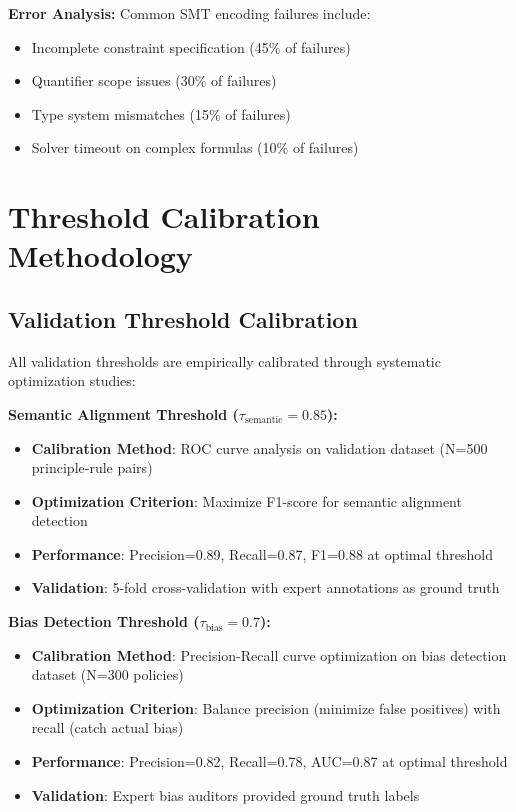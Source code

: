 \documentclass[sigconf,natbib]{acmart}
\begin{document}
\textbf{Error Analysis:}
Common SMT encoding failures include:
\begin{itemize}
    \item Incomplete constraint specification (45\% of failures)
    \item Quantifier scope issues (30\% of failures)
    \item Type system mismatches (15\% of failures)
    \item Solver timeout on complex formulas (10\% of failures)
\end{itemize}

\section{Threshold Calibration Methodology}
\label{app:threshold_calibration}

\subsection{Validation Threshold Calibration}
All validation thresholds are empirically calibrated through systematic optimization studies:

\textbf{Semantic Alignment Threshold ($\tau_{\text{semantic}} = 0.85$):}
\begin{itemize}
    \item \textbf{Calibration Method}: ROC curve analysis on validation dataset (N=500 principle-rule pairs)
    \item \textbf{Optimization Criterion}: Maximize F1-score for semantic alignment detection
    \item \textbf{Performance}: Precision=0.89, Recall=0.87, F1=0.88 at optimal threshold
    \item \textbf{Validation}: 5-fold cross-validation with expert annotations as ground truth
\end{itemize}

\textbf{Bias Detection Threshold ($\tau_{\text{bias}} = 0.7$):}
\begin{itemize}
    \item \textbf{Calibration Method}: Precision-Recall curve optimization on bias detection dataset (N=300 policies)
    \item \textbf{Optimization Criterion}: Balance precision (minimize false positives) with recall (catch actual bias)
    \item \textbf{Performance}: Precision=0.82, Recall=0.78, AUC=0.87 at optimal threshold
    \item \textbf{Validation}: Expert bias auditors provided ground truth labels
\end{itemize}
\end{document}
